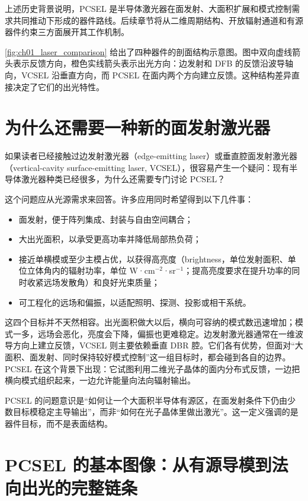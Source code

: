 上述历史背景说明，PCSEL 是半导体激光器在面发射、大面积扩展和模式控制需求共同推动下形成的器件路线。后续章节将从二维周期结构、开放辐射通道和有源器件约束三方面展开其工作机制。

\cref{fig:ch01_laser_comparison} 给出了四种器件的剖面结构示意图。图中双向虚线箭头表示反馈方向，橙色实线箭头表示出光方向：边发射和 DFB 的反馈沿波导轴向，VCSEL 沿垂直方向，而 PCSEL 在面内两个方向建立反馈。这种结构差异直接决定了它们的出光特性。


\section{为什么还需要一种新的面发射激光器}
如果读者已经接触过边发射激光器（edge-emitting laser）或垂直腔面发射激光器（vertical-cavity surface-emitting laser, VCSEL），很容易产生一个疑问：现有半导体激光器种类已经很多，为什么还需要专门讨论 PCSEL？

这个问题应从光源需求来回答。许多应用同时希望得到以下几件事：
\begin{itemize}
  \item 面发射，便于阵列集成、封装与自由空间耦合；
  \item 大出光面积，以承受更高功率并降低局部热负荷；
  \item 接近单横模或至少主模占优，以获得高亮度（brightness，单位发射面积、单位立体角内的辐射功率，单位 W·cm$^{-2}$·sr$^{-1}$；提高亮度要求在提升功率的同时收紧远场发散角）和良好光束质量；
  \item 可工程化的远场和偏振，以适配照明、探测、投影或相干系统。
\end{itemize}

这四个目标并不天然相容。出光面积做大以后，横向可容纳的模式数迅速增加；模式一多，远场会恶化，亮度会下降，偏振也更难稳定。边发射激光器通常在一维波导方向上建立反馈，VCSEL 则主要依赖垂直 DBR 腔。它们各有优势，但面对“大面积、面发射、同时保持较好模式控制”这一组目标时，都会碰到各自的边界。PCSEL 在这个背景下出现：它试图利用二维光子晶体的面内分布式反馈，一边把横向模式组织起来，一边允许能量向法向辐射输出。

\begin{IntuitionBox}
PCSEL 的问题意识是“如何让一个大面积半导体有源区，在面发射条件下仍由少数目标模稳定主导输出”，而非“如何在光子晶体里做出激光”。这一定义强调的是器件目标，而不是表面结构。
\end{IntuitionBox}

\section{PCSEL 的基本图像：从有源导模到法向出光的完整链条}
\label{sec:pcsel-basic-picture}

